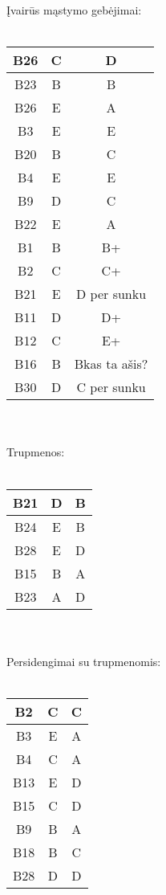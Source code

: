 \documentclass[a4paper]{article}
\begin{document}
\noindent Įvairūs mąstymo gebėjimai:
\\ \\
\begin{tabular}{|c|c||c|}
\hline
B26&C&D\\ \hline
B23&B&B \\ \hline
B26&E&A\\ \hline
B3&E&E \\ \hline
B20&B&C\\ \hline
B4&E&E \\ \hline
B9&D&C\\ \hline
B22&E&A\\ \hline
B1&B&B+\\ \hline
B2&C&C+ \\ \hline
B21&E&D per sunku\\ \hline
B11&D&D+ \\ \hline
B12&C&E+\\ \hline
B16&B&Bkas ta ašis?\\ \hline
B30&D&C per sunku\\ \hline
\end{tabular}
\\ \\
Trupmenos:
\\ \\
\begin{tabular}{|c|c||c|}
\hline
B21&D&B \\ \hline
B24&E&B \\ \hline
B28&E&D \\ \hline
B15&B&A \\ \hline
B23&A&D \\ \hline
\end{tabular}
\\ \\
Persidengimai su trupmenomis:
\\ \\
\begin{tabular}{|c|c||c|}
\hline
B2&C&C \\ \hline
B3&E&A \\ \hline
B4&C&A \\ \hline
B13&E&D \\ \hline
B15&C&D \\ \hline
B9&B&A \\ \hline
B18&B&C \\ \hline
B28&D&D \\ \hline
\end{tabular}
\end{document}
